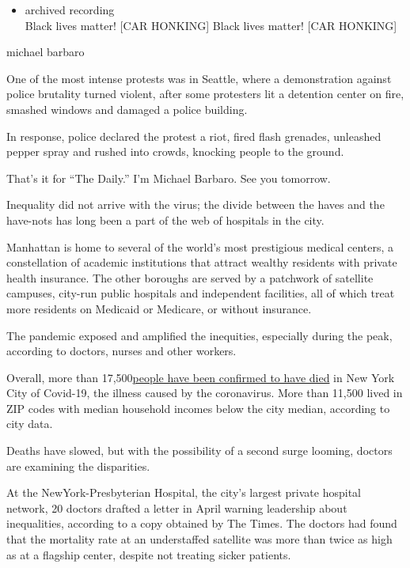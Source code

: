 \begin{itemize}
\tightlist
\item
  archived recording\\
  Black lives matter! {[}CAR HONKING{]} Black lives matter! {[}CAR
  HONKING{]}
\end{itemize}

michael barbaro

One of the most intense protests was in Seattle, where a demonstration
against police brutality turned violent, after some protesters lit a
detention center on fire, smashed windows and damaged a police building.

In response, police declared the protest a riot, fired flash grenades,
unleashed pepper spray and rushed into crowds, knocking people to the
ground.

That's it for ``The Daily.'' I'm Michael Barbaro. See you tomorrow.

Inequality did not arrive with the virus; the divide between the haves
and the have-nots has long been a part of the web of hospitals in the
city.

Manhattan is home to several of the world's most prestigious medical
centers, a constellation of academic institutions that attract wealthy
residents with private health insurance. The other boroughs are served
by a patchwork of satellite campuses, city-run public hospitals and
independent facilities, all of which treat more residents on Medicaid or
Medicare, or without insurance.

The pandemic exposed and amplified the inequities, especially during the
peak, according to doctors, nurses and other workers.

Overall, more than
17,500\href{https://www.nytimes3xbfgragh.onion/interactive/2020/nyregion/new-york-city-coronavirus-cases.html}{people
have been confirmed to have died} in New York City of Covid-19, the
illness caused by the coronavirus. More than 11,500 lived in ZIP codes
with median household incomes below the city median, according to city
data.

Deaths have slowed, but with the possibility of a second surge looming,
doctors are examining the disparities.

At the NewYork-Presbyterian Hospital, the city's largest private
hospital network, 20 doctors drafted a letter in April warning
leadership about inequalities, according to a copy obtained by The
Times. The doctors had found that the mortality rate at an understaffed
satellite was more than twice as high as at a flagship center, despite
not treating sicker patients.

